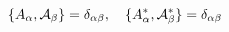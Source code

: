 \begin{equation}
\{ A_\alpha, {\cal{A}}_\beta \}=\delta_{\alpha \beta},~~~\{ A_\alpha^*, {\cal{A}}_\beta^* \}=\delta_{\alpha \beta}
\end{equation}

